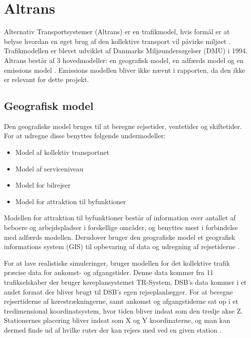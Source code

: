 \section{Altrans}
Alternativ Transportsystemer (Altrans) er en trafikmodel, hvis formål er at belyse hvordan en øget brug af den kollektive transport vil påvirke miljøet \cite[s. 14]{dmumodelanalyser}. Trafikmodellen er blevet udviklet af Danmarks Miljøundersøgelser (DMU) i 1994. Altrans består af 3 hovedmodeller: en geografisk model, en adfærds model og en emissions model \cite[s. 14]{dmuadfaerdsmodel}. Emissions modellen bliver ikke nævnt i rapporten, da den ikke er relevant for dette projekt.
\subsection{Geografisk model}
Den geografiske model bruges til at beregne rejsetider, ventetider og skiftetider. For at udregne disse benyttes følgende undermodeller:

\begin{itemize}
\item Model af kollektiv transportnet
\item Model af serviceniveau
\item Model for bilrejser
\item Model for attraktion til byfunktioner
\end{itemize}

Modellen for attraktion til byfunktioner består af information over antallet af beboere og arbejdspladser i forskellige områder, og benyttes mest i forbindelse med adfærds modellen. Derudover bruger den geografiske model et geografisk informations system (GIS) til opbevaring af data og udregning af rejsetiderne \cite[s. 18-19]{dmumodelanalyser}.

\vspace{5mm}

For at lave realistiske simuleringer, bruger modellen for det kollektive trafik præcise data for ankomst- og afgangstider. Denne data kommer fra 11 trafikselskaber der bruger køreplansystemet TR-System, DSB’s data kommer i et andet format der bliver brugt til DSB’s egen rejseplanlægger. For at beregne rejsertiderne af kørestrækningerne, samt ankomst og afgangstiderne sat op i et tredimensional koordinatsystem, hvor tiden bliver indsat som den tredje akse Z. Stationernes placering bliver indsat som X og Y koordinaterne, og man kan dermed finde ud af hvilke ruter der kan rejses med ved en given station \cite[s. 20-22]{dmumodelanalyser}.

